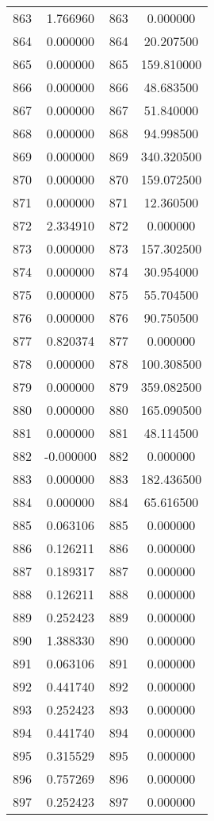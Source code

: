 \documentclass[12pt]{article}
\begin{document}
\begin{longtable}{@{}cccc@{}}
863 & 1.766960 & 863 & 0.000000 \\
864 & 0.000000 & 864 & 20.207500 \\
865 & 0.000000 & 865 & 159.810000 \\
866 & 0.000000 & 866 & 48.683500 \\
867 & 0.000000 & 867 & 51.840000 \\
868 & 0.000000 & 868 & 94.998500 \\
869 & 0.000000 & 869 & 340.320500 \\
870 & 0.000000 & 870 & 159.072500 \\
871 & 0.000000 & 871 & 12.360500 \\
872 & 2.334910 & 872 & 0.000000 \\
873 & 0.000000 & 873 & 157.302500 \\
874 & 0.000000 & 874 & 30.954000 \\
875 & 0.000000 & 875 & 55.704500 \\
876 & 0.000000 & 876 & 90.750500 \\
877 & 0.820374 & 877 & 0.000000 \\
878 & 0.000000 & 878 & 100.308500 \\
879 & 0.000000 & 879 & 359.082500 \\
880 & 0.000000 & 880 & 165.090500 \\
881 & 0.000000 & 881 & 48.114500 \\
882 & -0.000000 & 882 & 0.000000 \\
883 & 0.000000 & 883 & 182.436500 \\
884 & 0.000000 & 884 & 65.616500 \\
885 & 0.063106 & 885 & 0.000000 \\
886 & 0.126211 & 886 & 0.000000 \\
887 & 0.189317 & 887 & 0.000000 \\
888 & 0.126211 & 888 & 0.000000 \\
889 & 0.252423 & 889 & 0.000000 \\
890 & 1.388330 & 890 & 0.000000 \\
891 & 0.063106 & 891 & 0.000000 \\
892 & 0.441740 & 892 & 0.000000 \\
893 & 0.252423 & 893 & 0.000000 \\
894 & 0.441740 & 894 & 0.000000 \\
895 & 0.315529 & 895 & 0.000000 \\
896 & 0.757269 & 896 & 0.000000 \\
897 & 0.252423 & 897 & 0.000000 \\

\end{longtable}
\end{document}
